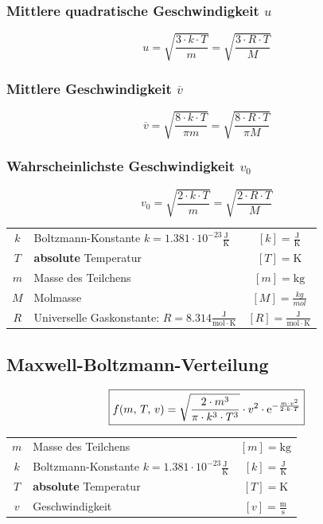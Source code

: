 \subsubsection{Mittlere quadratische Geschwindigkeit  $u$}

$$ \boxed{ u = \sqrt{\frac{3 \cdot k \cdot T}{m}} = \sqrt{\frac{3 \cdot R \cdot T}{M}} }  $$


\subsubsection{Mittlere Geschwindigkeit $\overline{v}$}

$$ \boxed{ \overline{v} = \sqrt{\frac{8 \cdot k \cdot T}{\pi m}} = \sqrt{\frac{8 \cdot R \cdot T}{\pi M}} }  $$


\subsubsection{Wahrscheinlichste Geschwindigkeit $v_0$}

$$ \boxed{ v_0 = \sqrt{\frac{2 \cdot k \cdot T}{m}} = \sqrt{\frac{2 \cdot R \cdot T}{M}}  }  $$




\begin{tabular}{c l c}
	\rule{0pt}{8pt}$k$ & Boltzmann-Konstante $k = 1.381 \cdot 10^{-23} \mathrm{\frac{J}{K}}$ & $[k] = \mathrm{\frac{J}{K}}$ \\
	$T$ & \textbf{absolute} Temperatur & $[T] = \mathrm{K}$ \\
	$m$ & Masse des Teilchens & $[m] = \mathrm{kg}$ \\
	$M$ & Molmasse & $[M] = \frac{kg}{mol}$ \\
	\rule{0pt}{10pt}$R$ & Universelle Gaskonstante: $R = 8.314 \mathrm{\frac{J}{mol \cdot K}}$ & $[R] = \mathrm{\frac{J}{mol \cdot K}} $ \\	
\end{tabular}




\subsection{Maxwell-Boltzmann-Verteilung}

$$ \boxed{ f(m, \, T, \, v) = \sqrt{\frac{2 \cdot m^3}{\pi \cdot k^3 \cdot T^3 }}  \cdot v^2 \cdot \mathrm{e} ^{- \frac{m \cdot v^2}{2 \cdot k \cdot T}}  }  $$


\begin{tabular}{c l c}
	$m$ & Masse des Teilchens & $[m] = \mathrm{kg}$ \\
	\rule{0pt}{8pt}$k$ & Boltzmann-Konstante $k = 1.381 \cdot 10^{-23} \mathrm{\frac{J}{K}}$ & $[k] = \mathrm{\frac{J}{K}}$ \\
	$T$ & \textbf{absolute} Temperatur & $[T] = \mathrm{K}$ \\
	\rule{0pt}{8pt}$v$ & Geschwindigkeit & $[v] = \mathrm{\frac{m}{s}}$ \\
\end{tabular}





